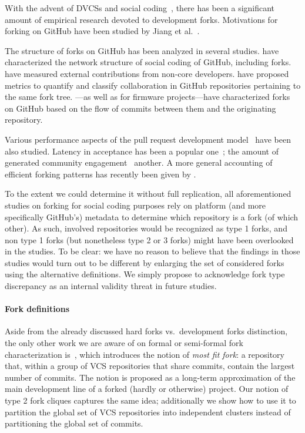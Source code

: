 With the advent of \glspl{DVCS} and social coding~\cite{lima2014ghsocial},
there has been a significant amount of empirical research devoted to
development forks. Motivations for forking on GitHub have been studied by Jiang
et al.~\cite{jiang2017whyfork}.

The structure of forks on GitHub has been analyzed in several studies.
\Textcite{thung2013network} have characterized the network structure of social
coding of GitHub, including forks. \Textcite{padhye2014extcontrib} have
measured external contributions from non-core developers.
\Textcite{biazzini2014maythefork} have proposed metrics to quantify and
classify collaboration in GitHub repositories pertaining to the same fork tree.
\Textcite{rastogi2016forking}---as well as \textcite{stuanciulescu2015forked}
for firmware projects---have characterized forks on GitHub based on the flow of
commits between them and the originating repository.

Various performance aspects of the pull request development
model~\cite{gousios2014pullrequests, gousios2015work} have been also
studied. Latency in acceptance has been a popular one~\cite{yu2015waitforit,
  tsay2014influence}; the amount of generated community
engagement~\cite{dabbish2012socialcoding, dabbish2012transparency} another.
A more general accounting of efficient forking patterns has recently been given
by \textcite{zhou2019fork}.

To the extent we could determine it without full replication, all
aforementioned studies on forking for social coding purposes rely on platform
(and more specifically GitHub's) metadata to determine which repository is a
fork (of which other). As such, involved repositories would be recognized as
type 1 forks, and non type 1 forks (but nonetheless type 2 or 3 forks) might
have been overlooked in the studies. To be clear: we have no reason to believe
that the findings in those studies would turn out to be different by enlarging
the set of considered forks using the alternative definitions. We simply
propose to acknowledge fork type discrepancy as an internal validity threat in
future studies.


\paragraph{Fork definitions}

Aside from the already discussed hard forks vs.\ development forks distinction,
the only other work we are aware of on formal or semi-formal fork
characterization is~\cite{swh-provenance-emse}, which introduces the notion of
\emph{most fit fork}: a repository that, within a group of \gls{VCS}
repositories that share commits, contain the largest number of commits. The
notion is proposed as a long-term approximation of the main development line of
a forked (hardly or otherwise) project. Our notion of type 2 fork cliques
captures the same idea; additionally we show how to use it to partition the
global set of VCS repositories into independent clusters instead of
partitioning the global set of commits.


